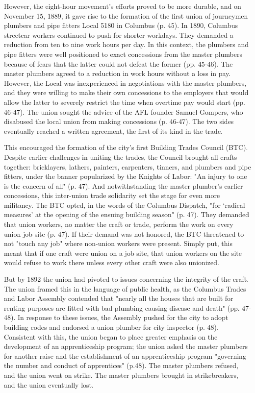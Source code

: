 \documentclass[12pt]{article}
\begin{document}
However, the eight-hour movement’s efforts proved to be more durable, and on November 15, 1889, it gave rise to the formation of the first union of journeymen plumbers and pipe fitters Local 5180 in Columbus (p. 45). In 1890, Columbus streetcar workers continued to push for shorter workdays. They demanded a reduction from ten to nine work hours per day. In this context, the plumbers and pipe fitters were well positioned to exact concessions from the master plumbers because of fears that the latter could not defeat the former (pp. 45-46). The master plumbers agreed to a reduction in work hours without a loss in pay. However, the Local was inexperienced in negotiations with the master plumbers, and they were willing to make their own concessions to the employers that would allow the latter to severely restrict the time when overtime pay would start (pp. 46-47). The union sought the advice of the AFL founder Samuel Gompers, who disabused the local union from making concessions (p. 46-47). The two sides eventually reached a written agreement, the first of its kind in the trade. 

This encouraged the formation of the city’s first Building Trades Council (BTC). Despite earlier challenges in uniting the trades, the Council brought all crafts together: bricklayers, lathers, painters, carpenters, tinners, and plumbers and pipe fitters, under the banner popularized by the Knights of Labor: "An injury to one is the concern of all" (p. 47). And notwithstanding the master plumber’s earlier concessions, this inter-union trade solidarity set the stage for even more militancy. The BTC opted, in the words of the Columbus Dispatch, "for ‘radical measures’ at the opening of the ensuing building season" (p. 47). They demanded that union workers, no matter the craft or trade, perform the work on every union job site (p. 47). If their demand was not honored, the BTC threatened to not "touch any job" where non-union workers were present. Simply put, this meant that if one craft were union on a job site, that union workers on the site would refuse to work there unless every other craft were also unionized.

But by 1892 the union had pivoted to issues concerning the integrity of the craft. The union framed this in the language of public health, as the Columbus Trades and Labor Assembly contended that "nearly all the houses that are built for renting purposes are fitted with bad plumbing causing disease and death" (pp. 47-48). In response to these issues, the Assembly pushed for the city to adopt building codes and endorsed a union plumber for city inspector (p. 48). Consistent with this, the union began to place greater emphasis on the development of an apprenticeship program; the union asked the master plumbers for another raise and the establishment of an apprenticeship program "governing the number and conduct of apprentices" (p.48). The master plumbers refused, and the union went on strike. The master plumbers brought in strikebreakers, and the union eventually lost.
\end{document}
